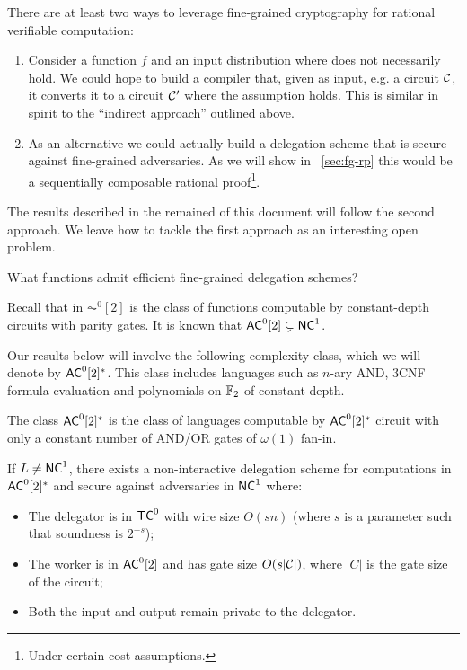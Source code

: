 There are  at least two ways to leverage fine-grained cryptography for rational verifiable computation:
\begin{enumerate}
	\item Consider a function $f$ and an input distribution where \NoFLAVA does not necessarily hold. We could hope to build a compiler that, given as input, e.g. a circuit $\cal{C}$, it converts it to a circuit $\cal{C}'$ where the assumption holds.
	This is similar in spirit to the ``indirect approach'' outlined above. %
	\item As an alternative we could actually build a delegation scheme that is secure against fine-grained adversaries. As we will show in ~\ref{sec:fg-rp} this would be a sequentially composable rational proof\footnote{Under certain cost assumptions.}.
\end{enumerate}

The results described in the remained of this document will follow the second approach.
We leave how to tackle the first approach as an interesting open problem.

\begin{question}
	What functions admit efficient fine-grained delegation schemes?
\end{question}



Recall that in $\AC^0[2]$ is the class of functions computable by constant-depth circuits with
parity gates. It is known that ${\mathsf{AC}}^0[2] \subsetneq {\ensuremath{\mathsf{NC}}}^1$.

Our results below will involve the following complexity class, which we will denote by ${\mathsf{AC}}^0[2]^*$. This class includes languages such as $n$-ary AND, 3CNF formula evaluation and polynomials on $\mathbb{F}_2$ of constant depth. 

\begin{definition}
The class ${\mathsf{AC}}^0[2]^*$ is the class of languages computable by ${\mathsf{AC}}^0[2]^*$ circuit with only a constant number of AND/OR gates of $\omega(1)$ fan-in.
\end{definition}

\begin{result}
	\label{res:delegation}
	If $L \not = {\mathsf{NC}}^1$, there exists a non-interactive delegation scheme for computations in ${\mathsf{AC}}^0[2]^*$ and secure against adversaries in ${\mathsf{NC}}^1$ where:
	\begin{itemize}
		\item The delegator is in ${\mathsf{TC}}^0$ with wire size $O(sn)$ (where $s$ is a parameter such that soundness  is $2^{-s}$);
		\item The worker is in ${\mathsf{AC}}^0[2]$ and has gate size $O(s|\cal{C}|)$, where $|C|$ is the gate size of the circuit;
		\item Both the input and output remain private to the delegator.
	\end{itemize} 
\end{result}

